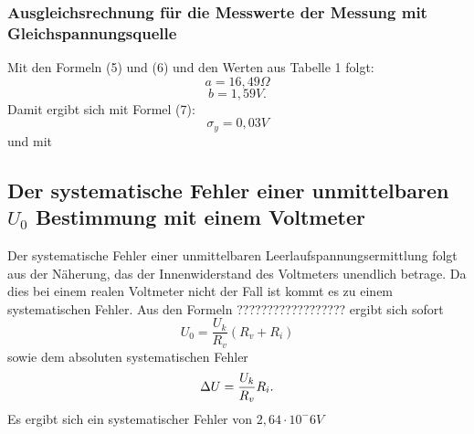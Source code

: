 \subsubsection{Ausgleichsrechnung für die Messwerte der Messung mit Gleichspannungsquelle}
Mit den Formeln (5) und (6) und den Werten aus Tabelle 1 folgt:
\begin{displaymath}
	a=16,49\Omega
\end{displaymath}
\begin{displaymath}
	b=1,59V\text{.}
\end{displaymath}
Damit ergibt sich mit Formel (7):
\begin{displaymath}
	\sigma_y=0,03V
\end{displaymath}
und mit 

























































\newpage
\subsection{Der systematische Fehler einer unmittelbaren $U_0$ Bestimmung mit einem Voltmeter}
Der systematische Fehler einer unmittelbaren Leerlaufspannungsermittlung folgt aus der Näherung, das
der Innenwiderstand des Voltmeters unendlich betrage. Da dies bei einem realen Voltmeter nicht der
Fall ist kommt es zu einem systematischen Fehler.
Aus den Formeln ?????????????????? ergibt sich sofort
\begin{equation}
U_0 = \frac{U_k}{R_v}(R_v + R_i)
\end{equation}
sowie dem absoluten systematischen Fehler
\begin{equation}
\Delta U = \frac{U_k}{R_v}R_i \text.
\end{equation}
Es ergibt sich ein systematischer Fehler von $2,64 \cdot 10^-6 V$





